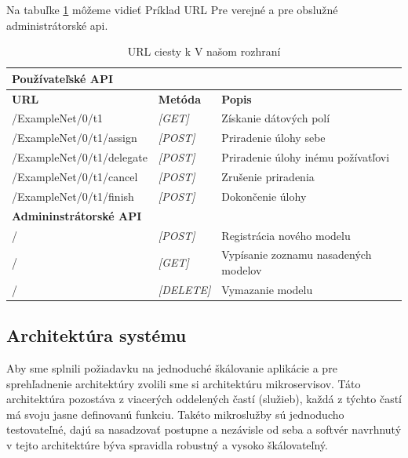 Na tabuľke \ref{urls_table} môžeme vidieť  Príklad URL Pre verejné a pre obslužné administrátorské \acrshort{api}.

\begin{table}[]
\begin{tabular}{|l|ll|}
\hline
\textbf{Používateľské API}     &                                            &                                      \\ \hline
\textbf{URL}                   & \multicolumn{1}{l|}{\textbf{Metóda}}       & \textbf{Popis}                       \\ \hline
/ExampleNet/0/t1               & \multicolumn{1}{l|}{\textit{{[}GET{]}}}    & Získanie dátových polí               \\ \hline
/ExampleNet/0/t1/assign        & \multicolumn{1}{l|}{\textit{{[}POST{]}}}   & Priradenie úlohy sebe                \\ \hline
/ExampleNet/0/t1/delegate      & \multicolumn{1}{l|}{\textit{{[}POST{]}}}   & Priradenie úlohy inému požívatľovi   \\ \hline
/ExampleNet/0/t1/cancel        & \multicolumn{1}{l|}{\textit{{[}POST{]}}}   & Zrušenie priradenia                  \\ \hline
/ExampleNet/0/t1/finish        & \multicolumn{1}{l|}{\textit{{[}POST{]}}}   & Dokončenie úlohy                     \\ \hline
\textbf{Admininstrátorské API} & \textit{}                                  &                                      \\ \hline
/                              & \multicolumn{1}{l|}{\textit{{[}POST{]}}}   & Registrácia nového modelu            \\ \hline
/                              & \multicolumn{1}{l|}{\textit{{[}GET{]}}}    & Vypísanie zoznamu nasadených modelov \\ \hline
/                              & \multicolumn{1}{l|}{\textit{{[}DELETE{]}}} & Vymazanie modelu                     \\ \hline
\end{tabular}
\caption{URL ciesty k V našom rozhraní}
\label{urls_table}
\end{table} 

\subsection{Architektúra systému}
Aby sme splnili požiadavku na jednoduché škálovanie aplikácie a pre sprehľadnenie architektúry zvolili sme si architektúru mikroservisov. Táto architektúra pozostáva z viacerých oddelených častí (služieb), každá z týchto častí má svoju jasne definovanú funkciu. Takéto mikroslužby sú jednoducho testovateľné, dajú sa nasadzovať postupne a nezávisle od seba a softvér navrhnutý v tejto architektúre býva spravidla robustný a vysoko škálovateľný.

